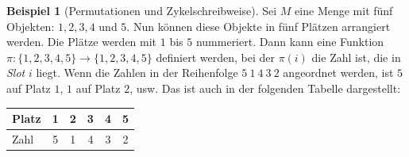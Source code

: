 \documentclass[12pt,a4paper, usenames, dvipsnames]{article}
\theoremstyle{mystyle}
\theoremstyle{definition}
\newtheorem{bsp}{Beispiel}[definition]
\begin{document}
\begin{bsp}[Permutationen und Zykelschreibweise]
Sei $M$ eine Menge mit fünf Objekten: $1, 2, 3, 4$ und $5$. Nun können diese Objekte in fünf Plätzen arrangiert werden. Die Plätze werden mit $1$ bis $5$ nummeriert. Dann kann eine Funktion $\pi :\{1,2,3,4,5\} \rightarrow \{1,2,3,4,5\}$ definiert werden, bei der $\pi (i)$ die Zahl ist, die in \textit{Slot} $i$ liegt.
Wenn die Zahlen in der Reihenfolge $5 \ 1\ 4\ 3 \ 2$ angeordnet werden, ist $5$ auf Platz $1$, $1$ auf Platz $2$, usw. Das ist auch in der folgenden Tabelle dargestellt: 

\begin{center}
\begin{tabular}{l ccccc}

Platz & 1 & 2 & 3 & 4 & 5 \\
\midrule
Zahl & 5 & 1 & 4 & 3 & 2 \\

\end{tabular}
\end{center}


\end{bsp}
\end{document}
